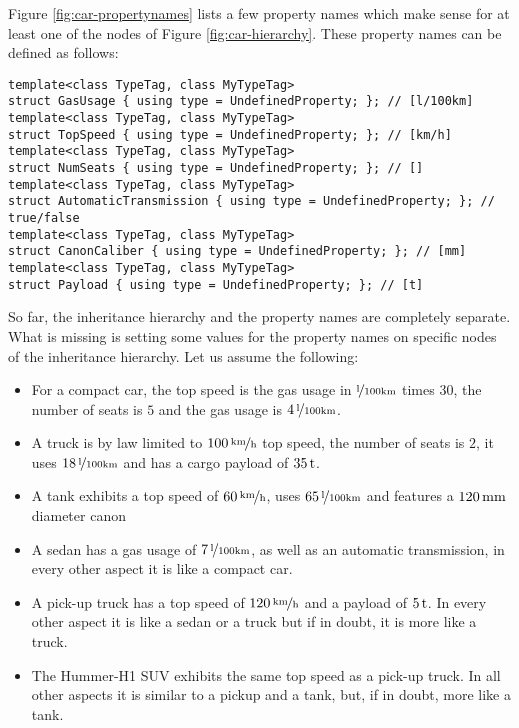 Figure \ref{fig:car-propertynames} lists a few property names which
make sense for at least one of the nodes of Figure
\ref{fig:car-hierarchy}. These property names can be defined as
follows:
\begin{lstlisting}[name=propsyscars,style=DumuxCode]
template<class TypeTag, class MyTypeTag>
struct GasUsage { using type = UndefinedProperty; }; // [l/100km]
template<class TypeTag, class MyTypeTag>
struct TopSpeed { using type = UndefinedProperty; }; // [km/h]
template<class TypeTag, class MyTypeTag>
struct NumSeats { using type = UndefinedProperty; }; // []
template<class TypeTag, class MyTypeTag>
struct AutomaticTransmission { using type = UndefinedProperty; }; // true/false
template<class TypeTag, class MyTypeTag>
struct CanonCaliber { using type = UndefinedProperty; }; // [mm]
template<class TypeTag, class MyTypeTag>
struct Payload { using type = UndefinedProperty; }; // [t]
\end{lstlisting}

\noindent
So far, the inheritance hierarchy and the property names are completely
separate. What is missing is setting some values for the property
names on specific nodes of the inheritance hierarchy. Let us assume
the following:
\begin{itemize}
\item For a compact car, the top speed is the gas usage in $\unitfrac{l}{100km}$
  times $30$, the number of seats is $5$ and the gas usage is
  $\unitfrac[4]{l}{100km}$.
\item A truck is by law limited to $\unitfrac[100]{km}{h}$ top speed, the number
  of seats is $2$, it uses $\unitfrac[18]{l}{100km}$ and has a cargo payload of
  $\unit[35]{t}$.
\item A tank exhibits a top speed of $\unitfrac[60]{km}{h}$, uses $\unitfrac[65]{l}{100km}$
  and features a $\unit[120]{mm}$ diameter canon
\item A sedan has a gas usage of $\unitfrac[7]{l}{100km}$, as well as an automatic
  transmission, in every other aspect it is like a compact car.
\item A pick-up truck has a top speed of $\unitfrac[120]{km}{h}$ and a payload of
  $\unit[5]{t}$. In every other aspect it is like a sedan or a truck but if in
  doubt, it is more like a truck.
\item The Hummer-H1 SUV exhibits the same top speed as a pick-up
  truck.  In all other aspects it is similar to a pickup and a tank,
  but, if in doubt, more like a tank.
\end{itemize}

